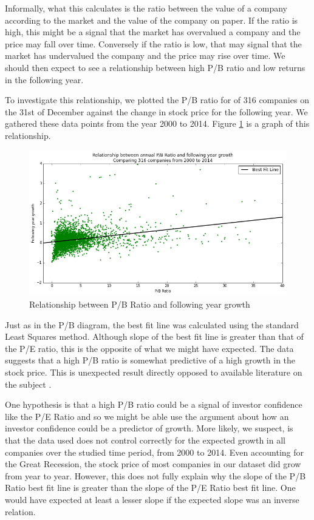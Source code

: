 \documentclass{report}
\begin{document}
Informally, what this calculates is the ratio between the value of a company according to the market and the value of the company on paper. If the ratio is high, this might be a signal that the market has overvalued a company and the price may fall over time. Conversely if the ratio is low, that may signal that the market has undervalued the company and the price may rise over time. We should then expect to see a relationship between high P/B ratio and low returns in the following year. 

To investigate this relationship, we plotted the P/B ratio for of 316 companies on the 31st of December against the change in stock price for the following year. We gathered these data points from the year 2000 to 2014. Figure \ref{fig:pb-abs} is a graph of this relationship.

\begin{figure}[H]
	\caption{Relationship between P/B Ratio and following year growth}
	\centerline{\includegraphics[width=\textwidth]{vis/pb-ratio-abs.png}}
	\label{fig:pb-abs}
\end{figure}

Just as in the P/B diagram, the best fit line was calculated using the standard Least Squares method. Although slope of the best fit line is greater than that of the P/E ratio, this is the opposite of what we might have expected. The data suggests that a high P/B ratio is somewhat  predictive of a high growth in the stock price. This is unexpected result directly opposed to available literature on the subject \cite{jensen1997new}. 

One hypothesis is that a high P/B ratio could be a signal of investor confidence like the P/E Ratio and so we might be able use the argument about how an investor confidence could be a predictor of growth. More likely, we suspect, is that the data used does not control correctly for the expected growth in all companies over the studied time period, from 2000 to 2014. Even accounting for the Great Recession, the stock price of most companies in our dataset did grow from year to year. However, this does not fully explain why the slope of the P/B Ratio best fit line is greater than the slope of the P/E Ratio best fit line. One would have expected at least a lesser slope if the expected slope was an inverse relation. 
\end{document}
